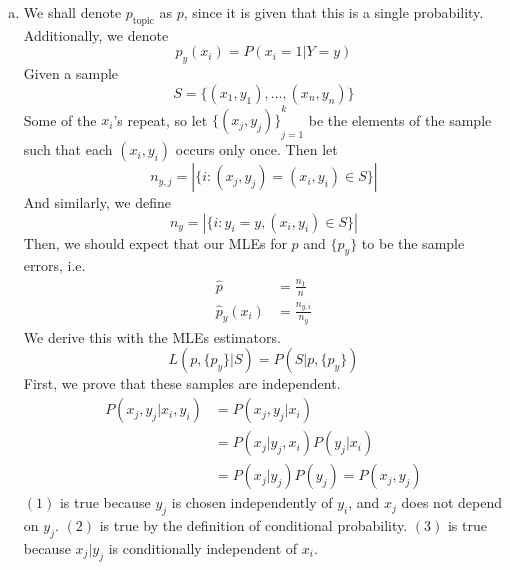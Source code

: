 \documentclass{amsart}
\theoremstyle{definition}
\begin{document}
\begin{enumerate}[(a)]
  \item 
    We shall denote $p_{\mathrm{topic}}$ as $p$, since it is given that this is a single probability. 
    Additionally, we denote 
    \[p_y(x_i) = P(x_i = 1|Y = y)\]
    Given a sample 
    \[
      S = \{(x_1,y_1), \ldots, (x_n, y_n)\}
    \]
    Some of the $x_i$'s repeat, so let ${\{(x_j, y_j)\}}_{j = 1}^k$ be the elements of the sample such that each $(x_i, y_i)$ occurs only once.
    Then let
    \[
      n_{y,j} = |\{i : (x_j, y_j) = (x_i, y_i) \in S\}|
    \]
    And similarly, we define
    \[n_y = |\{i : y_i = y, (x_i, y_i) \in S\}|\]
    Then, we should expect that our MLEs for $p$ and $\{p_y\}$ to be the sample errors, i.e. 
    \begin{align*}
      \hat{p} &= \frac{n_1}{n}\\
      \hat{p}_y(x_i) &= \frac{n_{y, i}}{n_y}
    \end{align*}
    We derive this with the MLEs estimators. 
    \[L(p, \{p_y\}|S) = P(S| p, \{p_y\})\]
    First, we prove that these samples are independent.
    \begin{align}
      P(x_j, y_j | x_i, y_i) &= P(x_j, y_j|x_i)\\
      &= P(x_j| y_j, x_i)P(y_j|x_i)\\
      &= P(x_j|y_j)P(y_j) = P(x_j, y_j)
    \end{align}
    $(1)$ is true because $y_j$ is chosen independently of $y_i$, and $x_j$ does not depend on $y_j$. 
	$(2)$ is true by the definition of conditional probability. 
	$(3)$ is true because $x_j | y_j$ is conditionally independent of $x_i$. 
	

\end{enumerate}
\end{document}
